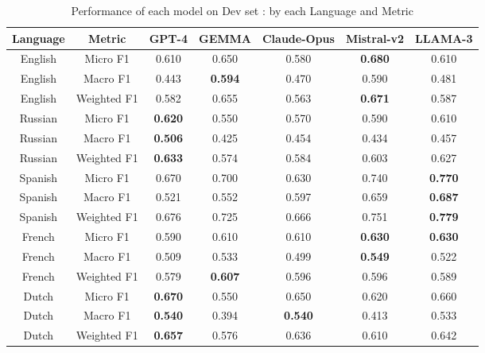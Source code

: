 \documentclass[11pt]{article}
\begin{document}
\begin{table*}[!ht]
    \centering
    \begin{tabular}{|c|c|c|c|c|c|c|}
    \hline
    \textbf{Language} & \textbf{Metric} & \hspace{0.4em}\textbf{GPT-4}\hspace{0.4em} & \textbf{GEMMA} & \textbf{Claude-Opus} & \textbf{Mistral-v2} & \textbf{LLAMA-3}\\
    \hline         
    English & Micro F1    & 0.610 & 0.650          & 0.580 & \textbf{0.680} & 0.610 \\
    English & Macro F1    & 0.443 & \textbf{0.594} & 0.470 & 0.590          & 0.481 \\
    English & Weighted F1 & 0.582 & 0.655          & 0.563 & \textbf{0.671} & 0.587 \\
    \hline
    Russian & Micro F1    & \textbf{0.620} & 0.550 & 0.570 & 0.590 & 0.610 \\
    Russian & Macro F1    & \textbf{0.506} & 0.425 & 0.454 & 0.434 & 0.457 \\
    Russian & Weighted F1 & \textbf{0.633} & 0.574 & 0.584 & 0.603 & 0.627 \\
    \hline     
    Spanish & Micro F1    & 0.670 & 0.700 & 0.630 & 0.740 & \textbf{0.770} \\
    Spanish & Macro F1    & 0.521 & 0.552 & 0.597 & 0.659 & \textbf{0.687} \\
    Spanish & Weighted F1 & 0.676 & 0.725 & 0.666 & 0.751 & \textbf{0.779} \\
    \hline     
    French  & Micro F1    & 0.590 & 0.610          & 0.610 & \textbf{0.630} & \textbf{0.630} \\
    French  & Macro F1    & 0.509 & 0.533          & 0.499 & \textbf{0.549} & 0.522          \\
    French  & Weighted F1 & 0.579 & \textbf{0.607} & 0.596 & 0.596          & 0.589          \\
    \hline     
    Dutch   & Micro F1    & \textbf{0.670} & 0.550 & 0.650          & 0.620 & 0.660 \\
    Dutch   & Macro F1    & \textbf{0.540} & 0.394 & \textbf{0.540} & 0.413 & 0.533 \\
    Dutch   & Weighted F1 & \textbf{0.657} & 0.576 & 0.636          & 0.610 & 0.642 \\
    \hline
    \end{tabular}
    \caption{Performance of each model on Dev set : by each Language and Metric}
    \label{table:5}
\end{table*}
\end{document}
